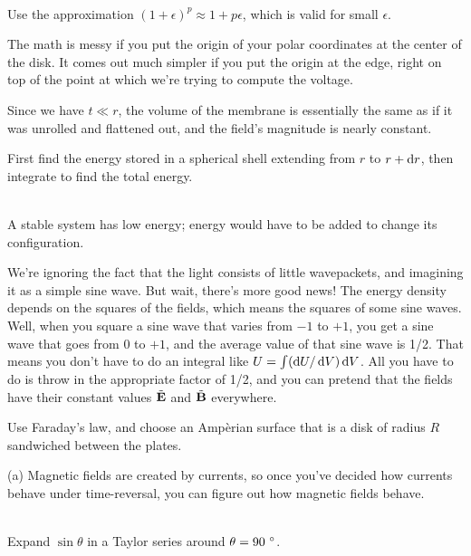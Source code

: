 \noindent{}\\
\label{hwhint:dipolev}
Use the approximation $(1+\epsilon)^p\approx1+p\epsilon$, 
which is valid for small $\epsilon$.

\label{hwhint:vedgedisk}
The math is messy if you put the origin of your polar coordinates
at the center of the disk. It comes out much simpler
if you put the origin at the edge, right on top of the point at
which we're trying to compute the voltage.

\label{hwhint:neuronenergy}
Since we have $t\ll r$, the volume of the membrane is essentially
the same as if it was unrolled and flattened out, and the
field's magnitude is nearly constant.

\label{hwhint:epointinfty}
First find the energy stored in a spherical shell extending
from $r$ to $r+\operatorname{d\!} r$, then integrate to find the total
energy.

\noindent{}\\
\label{hwhint:nestedsolenoids}
A stable system has low energy; energy would have to be added to
change its configuration.

\label{hwhint:solarconstant}
We're ignoring the fact that the light consists of little
wavepackets, and imagining it as a simple sine wave. But wait, there's
more good news! The energy density depends on the squares of the fields,
which means the squares of some sine waves. Well, when you square a sine
wave that varies from $-1$ to $+1$, you get a sine wave that goes from
0 to $+1$, and the average value of that sine wave is 1/2. That means
you don't have to do an integral like $U=\int (\operatorname{d\!} U/\operatorname{d\!} V)\operatorname{d\!} V$.
All you have to do is throw in the appropriate factor of 1/2, and you
can pretend that the fields have their constant values
$\tilde{\mathbf{E}}$ and $\tilde{\mathbf{B}}$ everywhere.


\label{hwhint:circularcap}
Use Faraday's law, and choose an Amp\`{e}rian surface that
is a disk of radius $R$ sandwiched between the plates.

\label{hwhint:timereversalem}
(a) Magnetic fields are created by currents, so once you've
decided how currents behave under time-reversal, you can
figure out how magnetic fields behave.
	
\noindent{}\\
\label{hwhint:very-weak-refraction}
Expand $\sin\theta$ in a Taylor series around $\theta=90\ \degunit$.


